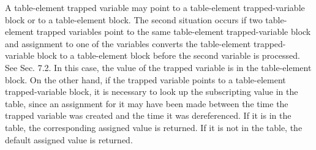 \goodbreak
{}

A table-element trapped variable may point to a table-element
trapped-variable block or to a table-element block. The second
situation occurs if two table-element trapped variables point to the
same table-element trapped-variable block and assignment to one of the
variables converts the table-element trapped-variable block to a
table-element block before the second variable is processed. See
Sec. 7.2. In this case, the value of the trapped variable is in the
table-element block. On the other hand, if the trapped variable points
to a table-element trapped-variable block, it is necessary to look up
the subscripting value in the table, since an assignment for it may
have been made between the time the trapped variable was created and
the time it was dereferenced. If it is in the table, the corresponding
assigned value is returned. If it is not in the table, the default
assigned value is returned.

